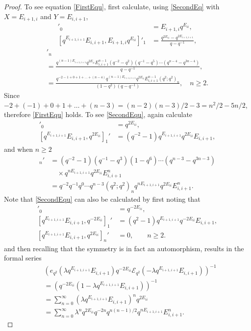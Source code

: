 \documentclass{ximera}
\begin{document}
\begin{proof}
To see equation \eqref{FirstEqu}, first calculate, using \eqref{SecondEq} with $X=E_{i+1,i}$ and $Y=E_{i,i+1}$,
\begin{align*}
[q^{E_{i+1,i+1}}E_{i,i+1}   ,E_{i+1,i} q^{E_{ii}} ]'_0 &= E_{i+1,i} q^{E_{ii}}  ,\\
[q^{E_{i+1,i+1}}E_{i,i+1},E_{i+1,i} q^{E_{ii}} ]'_1 &=  \frac{q^{2E_{ii}}-q^{2E_{i+1,i+1}}}{q-q^{-1}}, 
\end{align*}
\begin{multline*}
  [q^{E_{i+1,i+1}}E_{i,i+1},E_{i+1,i} q^{E_{ii}} ]'_n
  \\=  \frac{   q^{(n-1)E_{i+1,i+1}} q^{2E_{ii}} E_{i,i+1}^{n-1}(q^{-2}-q^2)(q^{-1}-q^5) \cdots (q^{n-4}-q^{3n-4})}{q-q^{-1}}, \\
=  \frac{   q^{-2-1+0+1+\ldots+(n-4)}q^{(n-1)E_{i+1,i+1}} q^{2E_{ii}} E_{i,i+1}^{n-1} (q^2;q^2)_{n} } {(1-q^2)(q-q^{-1})}  , \quad n \geq 2.  
\end{multline*}
Since $-2+(-1)+0+1+\ldots+(n-3)=(n-2)(n-3)/2-3 = n^2/2-5n/2$, therefore \eqref{FirstEqu} holds. To see  \eqref{SecondEqu}, again calculate 
\begin{align*}
[q^{E_{i+1,i+1}}E_{i,i+1},  q^{2E_{ii}}   ]'_0 &= q^{2E_{ii}} ,\\
[q^{E_{i+1,i+1}}E_{i,i+1}, q^{2E_{ii}}]_1' &= (q^{-2}-1)q^{E_{i+1,i+1}}q^{2E_{ii}}E_{i,i+1}  , 
\end{align*}
and when $n\ge 2$
\begin{align*}
[q^{E_{i+1,i+1}}E_{i,i+1},  q^{2E_{ii}}]_n'&=  (q^{-2}-1)(q^{-1} - q^3  )(1-q^6)\cdots (q^{n-3}-q^{3n-3})  \\ & \quad\times q^{nE_{i+1,i+1}}q^{2E_{ii}}E_{i,i+1}^n \\
&=q^{-2}q^{-1}q^0\cdots q^{n-3} (q^2;q^2)_n q^{nE_{i+1,i+1}}q^{2E_{ii}}E_{i,i+1}^n.
\end{align*}
Note that \eqref{SecondEqu}  can also be calculated by first noting that
\begin{align*}
[q^{E_{i+1,i+1}}E_{i,i+1},  q^{-2E_{ii}}   ]'_0 &= q^{-2E_{ii}} ,\\
[q^{E_{i+1,i+1}}E_{i,i+1}, q^{-2E_{ii}}]_1' &= (q^{2}-1)q^{E_{i+1,i+1}}q^{-2E_{ii}}E_{i,i+1}  ,  \\
[q^{E_{i+1,i+1}}E_{i,i+1},  q^{2E_{ii}}]_n'&=  0, \quad  \quad n \geq 2.
\end{align*}
and then recalling that the symmetry is in fact an automorphism, results in the formal series
\begin{align*}
 &\left( e_{q^2}(\lambda q^{E_{i+1,i+1}}E_{i,i+1})q^{-2E_{ii}}  \mathcal{E}_{q^2}(-\lambda q^{E_{i+1,i+1}}E_{i,i+1}) \right)^{-1}  \\
 &= \left(q^{-2E_{ii}}(1 -\lambda q^{E_{i+1,i+1}}E_{i,i+1})\right)^{-1}\\
&= \sum_{n=0}^{\infty}\left( \lambda q^{E_{i+1,i+1}}E_{i,i+1}\right)^nq^{2E_{ii}} \\
&= \sum_{n=0}^{\infty} \lambda^nq^{2E_{ii}} q^{-2n} q^{n(n-1)/2}  q^{nE_{i+1,i+1}}E_{i,i+1}^n.   
\end{align*}





\end{proof}
\end{document}
